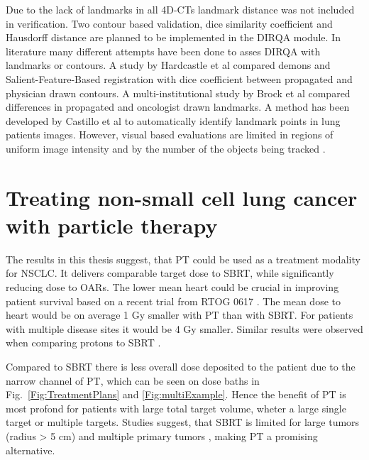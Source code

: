 
Due to the lack of landmarks in all 4D-CTs landmark distance was not included in verification. Two contour based validation, dice similarity coefficient \cite{Varadhan2013} and Hausdorff distance \cite{Huttenlocher1993}
are planned to be implemented in the DIRQA module. In literature many different attempts have been done to asses DIRQA with landmarks or contours. 
A study by Hardcastle et al \cite{Hardcastle2012} 
compared demons and Salient-Feature-Based registration with dice coefficient between propagated and physician drawn contours.
A multi-institutional study by Brock et al \cite{Brock2010} compared differences in propagated and oncologist drawn landmarks. 
A method has been developed by Castillo et al \cite{Castillo2009} to automatically identify landmark points
in lung patients images. However, visual based evaluations are limited in regions of uniform image intensity and by the number of the objects being tracked \cite{Kashani2008, Liu2012}.



\newpage
\section{Treating non-small cell lung cancer with particle therapy}

The results in this thesis suggest, that PT could be used as a treatment modality for NSCLC. It delivers comparable target dose to SBRT, while significantly reducing 
dose to OARs. The lower mean heart could be crucial in improving patient survival based on a recent trial from RTOG 0617 \cite{Bradley2015}. 
The mean dose to heart would be on average 1 Gy smaller with PT than with SBRT. 
For patients with multiple disease sites it would be 4 Gy smaller. Similar results were observed when comparing protons to SBRT \cite{Georg2008}. 

Compared to SBRT there is less overall dose deposited to the patient due to the narrow channel of PT, which can be seen on dose baths in 
Fig.~\ref{Fig:TreatmentPlans} and \ref{Fig:multiExample}.
Hence the benefit of PT is most profond for patients with large total target volume, wheter a large single target or multiple targets. Studies suggest, that SBRT is limited for large
tumors (radius > 5 cm) and multiple primary tumors \cite{Timmerman2006, Georg2008, Westover2012}, making PT a promising alternative.

